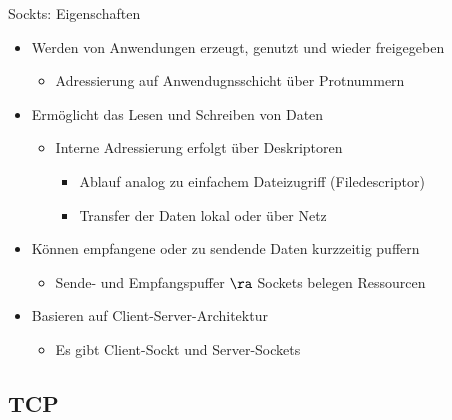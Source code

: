       Sockts: Eigenschaften
      \begin{itemize}
        \item Werden von Anwendungen erzeugt, genutzt und wieder freigegeben
          \begin{itemize}
            \item Adressierung auf Anwendugnsschicht über Protnummern
          \end{itemize}
        \item Ermöglicht das Lesen und Schreiben von Daten
          \begin{itemize}
            \item Interne Adressierung erfolgt über Deskriptoren
              \begin{itemize}
                \item Ablauf analog zu einfachem Dateizugriff (Filedescriptor)
                \item Transfer der Daten lokal oder über Netz
              \end{itemize}
          \end{itemize}
        \item Können empfangene oder zu sendende Daten kurzzeitig puffern
          \begin{itemize}
            \item Sende- und Empfangspuffer $\ra$ Sockets belegen Ressourcen
          \end{itemize}
        \item Basieren auf Client-Server-Architektur
          \begin{itemize}
            \item Es gibt Client-Sockt und Server-Sockets
          \end{itemize}
      \end{itemize}
  \subsection{TCP}
